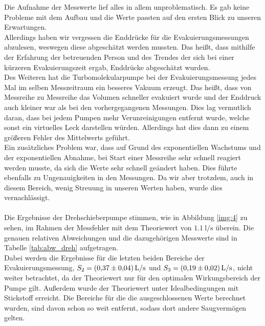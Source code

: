 \noindent Die Aufnahme der Messwerte lief alles in allem unproblematisch. Es gab keine Probleme mit dem Aufbau und die Werte passten auf den ersten Blick zu unseren Erwartungen.\\
Allerdings haben wir vergessen die Enddrücke für die Evakuierungsmessungen abzulesen, weswegen diese abgeschätzt werden mussten.
Das heißt, dass mithilfe der Erfahrung der betreuenden Person und des Trendes der sich bei einer kürzeren Evakuierungszeit ergab, Enddrücke abgeschätzt wurden.\\  
Des Weiteren hat die Turbomolekularpumpe bei der Evakuierungsmessung jedes Mal im selben Messzeitraum ein besseres Vakuum erzeugt. 
Das heißt, dass von Messreihe zu Messreihe das Volumen schneller evakuiert wurde und der Enddruck auch kleiner war als bei den vorhergegangenen Messungen.
Dies lag vermutlich daran, dass bei jedem Pumpen mehr Verunreinigungen entfernt wurde, welche sonst ein virtuelles Leck darstellen würden. 
Allerdings hat dies dann zu einem größeren Fehler des Mittelwerts geführt.\\
Ein zusätzliches Problem war, dass auf Grund des exponentiellen Wachstums und der exponentiellen Abnahme, bei Start einer Messreihe sehr schnell reagiert werden musste, da sich die Werte sehr schnell geändert haben.
Dies führte ebenfalls zu Ungenauigkeiten in den Messungen. Da wir aber trotzdem, auch in diesem Bereich, wenig Streuung in unseren Werten haben, wurde dies vernachlässigt.\\\\
\noindent
Die Ergebnisse der Drehschieberpumpe stimmen, wie in Abbildung \ref{img:4} zu sehen, im Rahmen der Messfehler mit dem Theoriewert von $\SI{1.1}{\litre\per\second}$ überein.
Die genauen relativen Abweichungen und die dazugehörigen Messwerte sind in Tabelle \ref{tab:abw_dreh} aufgetragen. \\
Dabei werden die Ergebnisse für die letzten beiden Bereiche der Evakuierungsmessung, $S_2 = \SI{0.37 (004)}{\litre\per\second}$ und $S_3 = \SI{0.19 (002)}{\litre\per\second}$, nicht weiter betrachtet,
da der Theoriewert nur für den optimalen Wirkungsbereich der Pumpe gilt. Außerdem wurde der Theoriewert unter Idealbedingungen mit Stickstoff erreicht.
Die Bereiche für die die ausgeschlossenen Werte berechnet wurden, sind davon schon so weit entfernt, sodass dort andere Saugvermögen gelten. \\
